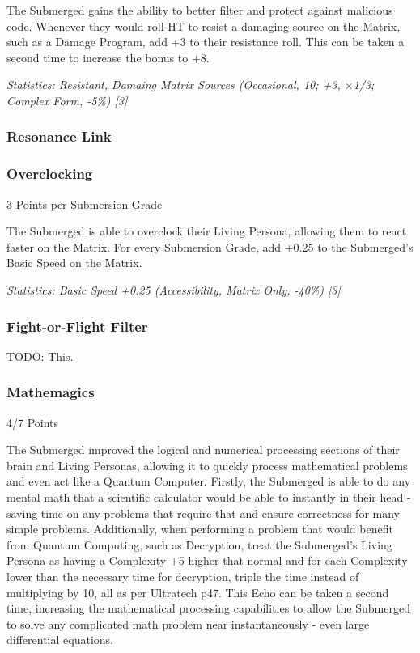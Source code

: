 \begin{multicols*}{3}
	The Submerged gains the ability to better filter and protect against malicious code. Whenever they would roll HT to resist a damaging source on the Matrix, such as a Damage Program, add +3 to their resistance roll. This can be taken a second time to increase the bonus to +8.
	
	\textit{\textcolor{OliveGreen}{Statistics: Resistant, Damaing Matrix Sources (Occasional, 10; +3, $\times$1/3; Complex Form, -5\%) [3] }}
	
	\subsubsection{Resonance Link}
	
	\subsubsection{Overclocking}
	\begin{flushright}
		3 Points per Submersion Grade
	\end{flushright}

	The Submerged is able to overclock their Living Persona, allowing them to react faster on the Matrix. For every Submersion Grade, add +0.25 to the Submerged's Basic Speed on the Matrix.	
	
	\textit{\textcolor{OliveGreen}{Statistics: Basic Speed +0.25 (Accessibility, Matrix Only, -40\%) [3] }}
	
	\subsubsection{Fight-or-Flight Filter}
	TODO: This.
	
	\subsubsection{Mathemagics}
	\begin{flushright}
		4/7 Points
	\end{flushright}
	
	The Submerged improved the logical and numerical processing sections of their brain and Living Personas, allowing it to quickly process mathematical problems and even act like a Quantum Computer. Firstly, the Submerged is able to do any mental math that a scientific calculator would be able to instantly in their head - saving time on any problems that require that and ensure correctness for many simple problems. Additionally, when performing a problem that would benefit from Quantum Computing, such as Decryption, treat the Submerged's Living Persona as having a Complexity +5 higher that normal and for each Complexity lower than the necessary time for decryption, triple the time instead of multiplying by 10, all as per Ultratech p47. This Echo can be taken a second time, increasing the mathematical processing capabilities to allow the Submerged to solve any complicated math problem near instantaneously - even large differential equations.
	

\end{multicols*}
